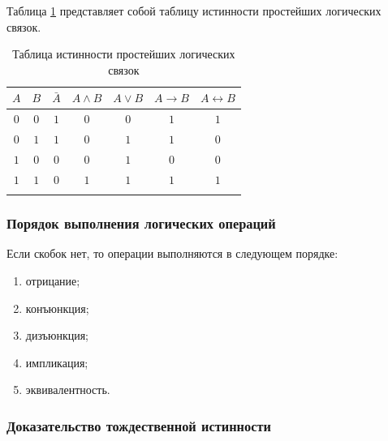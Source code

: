 Таблица \ref{tab:truth-table-slc} представляет собой таблицу истинности простейших логических связок.

{
\renewcommand*{\arraystretch}{1.5}
\begin{longtable}{|c|c|c|c|c|c|c|}
    \hline
    \(A\) & \(B\) & \(\bar{A}\) & \(A \land B\) & \(A \lor B\) & \(A \to B\) & \(A \leftrightarrow B\) \\
    \hline
    \(0\) & \(0\) & \(1\)       & \(0\)         & \(0\)        & \(1\)       & \(1\)                   \\
    \hline
    \(0\) & \(1\) & \(1\)       & \(0\)         & \(1\)        & \(1\)       & \(0\)                   \\
    \hline
    \(1\) & \(0\) & \(0\)       & \(0\)         & \(1\)        & \(0\)       & \(0\)                   \\
    \hline
    \(1\) & \(1\) & \(0\)       & \(1\)         & \(1\)        & \(1\)       & \(1\)                   \\
    \hline
    \caption{Таблица истинности простейших логических связок}
    \label{tab:truth-table-slc}
\end{longtable}
}


\subsubsection{Порядок выполнения логических операций}

Если скобок нет, то операции выполняются в следующем порядке:
\begin{enumerate}
    \item отрицание;
    \item конъюнкция;
    \item дизъюнкция;
    \item импликация;
    \item эквивалентность.
\end{enumerate}

\subsubsection{Доказательство тождественной истинности}

